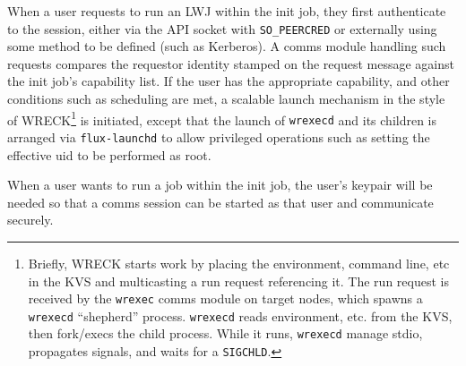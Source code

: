 \documentclass[10pt]{article}
\newcommand{\flux}{Flux}
\newcommand{\zMQ}{\O{}MQ}
\begin{document}
When a user requests to run an LWJ within the init job, they first
authenticate to the session, either via the API socket with {\tt SO\_PEERCRED}
or externally using some method to be defined (such as Kerberos).
A comms module handling such requests compares the requestor identity
stamped on the request message against the init job's capability list.
If the user has the appropriate capability, and other conditions such as
scheduling are met, a scalable launch mechanism in the style of
WRECK\footnote{
  Briefly, WRECK starts work by placing the environment, command line,
  etc in the KVS and multicasting a run request referencing it.
  The run request is received by the {\tt wrexec} comms module on target
  nodes, which spawns a {\tt wrexecd} ``shepherd'' process.  {\tt wrexecd}
  reads environment, etc. from the KVS, then fork/execs the child process.
  While it runs, {\tt wrexecd} manage stdio, propagates signals,
  and waits for a {\tt SIGCHLD}.
}
is initiated, except that the launch of {\tt wrexecd} and its children
is arranged via {\tt flux-launchd} to allow privileged operations such as
setting the effective uid to be performed as root.

When a user wants to run a job within the init job, the user's keypair
will be needed so that a comms session can be started as that user and
communicate securely.


%
%
\end{document}
